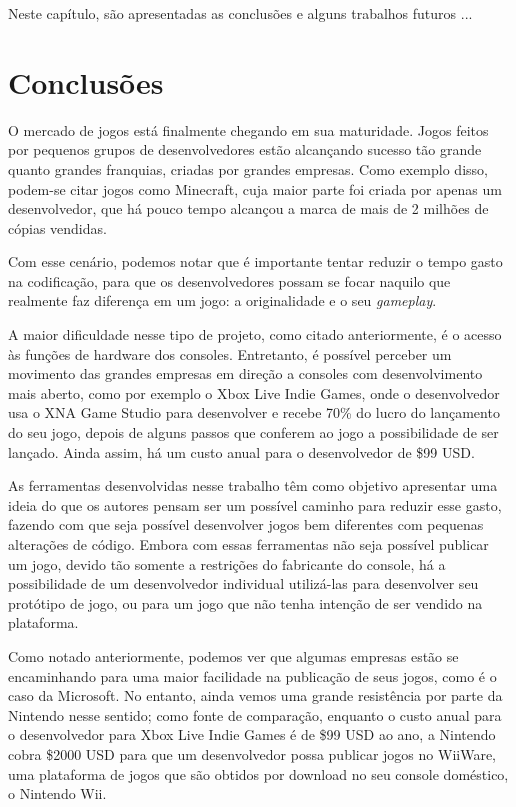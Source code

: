 \documentclass[brazil]{abnt}
\begin{document}
Neste capítulo, são apresentadas as conclusões e alguns trabalhos futuros
...
\newpage


\section{Conclusões}

O mercado de jogos está finalmente chegando em sua maturidade. Jogos feitos por pequenos grupos de desenvolvedores estão alcançando sucesso tão grande quanto grandes franquias, criadas por grandes empresas. Como exemplo disso, podem-se citar jogos como Minecraft, cuja maior parte foi criada por apenas um desenvolvedor, que há pouco tempo alcançou a marca de mais de 2 milhões de cópias vendidas. \cite{MinecraftSales}

Com esse cenário, podemos notar que é importante tentar reduzir o tempo gasto na codificação, para que os desenvolvedores possam se focar naquilo que realmente faz diferença em um jogo: a originalidade e o seu \textit{gameplay}.

A maior dificuldade nesse tipo de projeto, como citado anteriormente, é o acesso às funções de hardware dos consoles. Entretanto, é possível perceber um movimento das grandes empresas em direção a consoles com desenvolvimento mais aberto, como por exemplo o Xbox Live Indie Games, onde o desenvolvedor usa o XNA Game Studio para desenvolver e recebe 70\% do lucro do lançamento do seu jogo, depois de alguns passos que conferem ao jogo a possibilidade de ser lançado. Ainda assim, há um custo anual para o desenvolvedor de \$99 USD. \cite{XNAAppHub}

As ferramentas desenvolvidas nesse trabalho têm como objetivo apresentar uma ideia do que os autores pensam ser um possível caminho para reduzir esse gasto, fazendo com que seja possível desenvolver jogos bem diferentes com pequenas alterações de código. Embora com essas ferramentas não seja possível publicar um jogo, devido tão somente a restrições do fabricante do console, há a possibilidade de um desenvolvedor individual utilizá-las para desenvolver seu protótipo de jogo, ou para um jogo que não tenha intenção de ser vendido na plataforma.

Como notado anteriormente, podemos ver que algumas empresas estão se encaminhando para uma maior facilidade na publicação de seus jogos, como é o caso da Microsoft. No entanto, ainda vemos uma grande resistência por parte da Nintendo nesse sentido; como fonte de comparação, enquanto o custo anual para o desenvolvedor para Xbox Live Indie Games é de \$99 USD ao ano, a Nintendo cobra \$2000 USD para que um desenvolvedor possa publicar jogos no WiiWare, uma plataforma de jogos que são obtidos por download no seu console doméstico, o Nintendo Wii. \cite{WiiWare}
\end{document}
